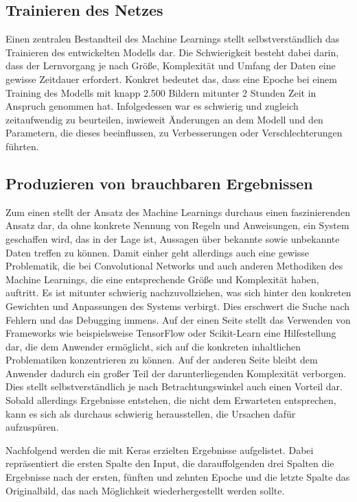 \subsection{Trainieren des Netzes}

Einen zentralen Bestandteil des Machine Learnings stellt selbstverständlich das Trainieren des entwickelten Modells dar.
Die Schwierigkeit besteht dabei darin, dass der Lernvorgang je nach Größe, Komplexität und Umfang der Daten eine gewisse
Zeitdauer erfordert. Konkret bedeutet das, dass eine Epoche bei einem Training des Modells mit knapp 2.500 Bildern mitunter
2 Stunden Zeit in Anspruch genommen hat. Infolgedessen war es schwierig und zugleich zeitaufwendig zu beurteilen,
inwieweit Änderungen an dem Modell und den Parametern, die dieses beeinflussen, zu Verbesserungen oder Verschlechterungen
führten.

\subsection{Produzieren von brauchbaren Ergebnissen}

Zum einen stellt der Ansatz des Machine Learnings durchaus einen faszinierenden Ansatz dar, da ohne konkrete Nennung von
Regeln und Anweisungen, ein System geschaffen wird, das in der Lage ist, Aussagen über bekannte sowie unbekannte Daten
treffen zu können. Damit einher geht allerdings auch eine gewisse Problematik, die bei Convolutional Networks und auch
anderen Methodiken des Machine Learnings, die eine entsprechende Größe und Komplexität haben, auftritt. Es ist mitunter
schwierig nachzuvollziehen, was sich hinter den konkreten Gewichten und Anpassungen des Systems verbirgt. Dies erschwert
die Suche nach Fehlern und das Debugging immens.
Auf der einen Seite stellt das Verwenden von Frameworks wie beispielsweise TensorFlow oder Scikit-Learn eine Hilfestellung
dar, die dem Anwender ermöglicht, sich auf die konkreten inhaltlichen Problematiken konzentrieren zu können. Auf der
anderen Seite bleibt dem Anwender dadurch ein großer Teil der darunterliegenden Komplexität verborgen. Dies stellt
selbstverständlich je nach Betrachtungswinkel auch einen Vorteil dar. Sobald allerdings Ergebnisse entstehen, die nicht
dem Erwarteten entsprechen, kann es sich als durchaus schwierig herausstellen, die Ursachen dafür aufzuspüren.

Nachfolgend werden die mit Keras erzielten Ergebnisse aufgelistet. Dabei repräsentiert die ersten Spalte den Input,
die darauffolgenden drei Spalten die Ergebnisse nach der ersten, fünften und zehnten Epoche und die letzte Spalte das
Originalbild, das nach Möglichkeit wiederhergestellt werden sollte.

